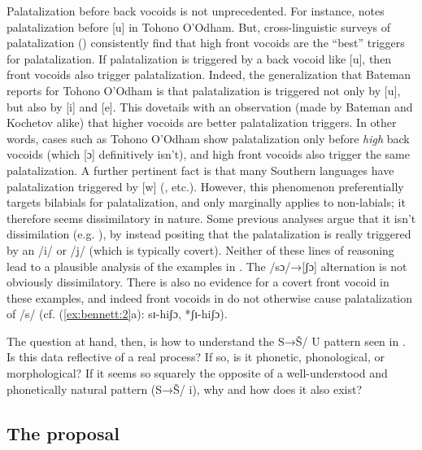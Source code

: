 \documentclass[output=paper,newtxmath,modfonts,nonflat,hidelinks]{langsci/langscibook}
\begin{document}
Palatalization before back vocoids is not unprecedented. For instance, \citet[68]{Bateman:2007aa} notes palatalization before [u] in Tohono O’Odham. But, cross-linguistic surveys of palatalization (\citealt{Bateman:2007aa,Kochetov2011}) consistently find that high front vocoids are the ``best'' triggers for palatalization. If palatalization is triggered by a back vocoid like [u], then front vocoids also trigger palatalization. Indeed, the generalization that Bateman reports for Tohono O’Odham is that palatalization is triggered not only by [u], but also by [i] and [e]. This dovetails with an observation (made by Bateman and Kochetov alike) that higher vocoids are better palatalization triggers. In other words, cases such as  Tohono O’Odham show palatalization only before \textit{high} back vocoids (which [ɔ] definitively isn’t), and high front vocoids also trigger the same palatalization.
A further pertinent fact is that many Southern  languages have palatalization triggered by [w] (\citealt{Louw1975,Ohala1978,Herbert1990,Bennett2015,Bennett&Braver2016}, etc.).  However, this phenomenon preferentially targets bilabials for palatalization, and only marginally applies to non-labials; it therefore seems dissimilatory in nature. Some previous analyses argue that it isn’t dissimilation (e.g. \citealt{Kotze&Zerbian2008}), by instead positing that the palatalization is really triggered by an /i/ or /j/ (which is typically covert). Neither of these lines of reasoning lead to a plausible analysis of the  examples in . The /sɔ/→[ʃɔ] alternation is not obviously dissimilatory. There is also no evidence for a covert front vocoid in these examples, and indeed front vocoids in  do not otherwise cause palatalization of /s/ (cf. (\ref{ex:bennett:2}a): sɪ-hiʃɔ, *ʃɪ-hiʃɔ).

The question at hand, then, is how to understand the S→Š/ {\longrule} U pattern seen in . Is this data reflective of a real process? If so, is it phonetic, phonological, or morphological? If it seems so squarely the opposite of a well-understood and phonetically natural pattern (S→Š/ {\longrule} i), why and how does it also exist?

\subsection{The proposal}\label{sec:bennett:1.2}
\end{document}
